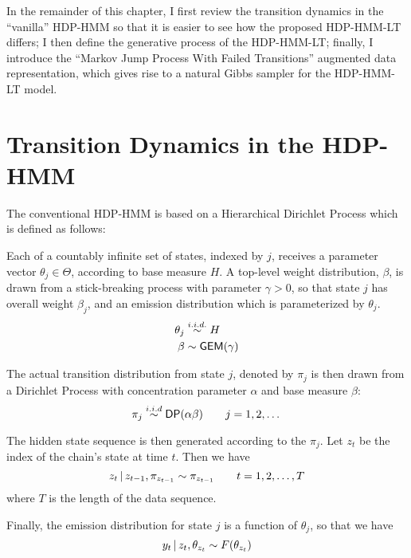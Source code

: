 In the remainder of this chapter, 
I first review the transition dynamics in the ``vanilla'' HDP-HMM so
that it is easier to see how the proposed HDP-HMM-LT differs; I then
define the generative process of the HDP-HMM-LT; finally, I introduce
the ``Markov Jump Process With Failed Transitions'' augmented data
representation, which gives rise to a natural Gibbs sampler for the
HDP-HMM-LT model.

\section{Transition Dynamics in the HDP-HMM}
\label{sec:transition-dynamics}

The conventional HDP-HMM \citep{teh2006hierarchical} is based on a 
Hierarchical Dirichlet Process which is defined as follows:

Each of a countably infinite set of states, indexed by $j$, receives a
parameter vector $\theta_j \in \Theta$, according to base measure $H$.  A top-level
weight distribution, $\beta$, is drawn from a stick-breaking
process with parameter $\gamma > 0$, so that state $j$ has overall
weight $\beta_j$, and an emission distribution which is parameterized by $\theta_j$.
\begin{align}
\theta_j &\stackrel{i.i.d.}{\sim} H \\
\beta &\sim \mathsf{GEM}(\gamma)
\end{align}

The actual transition distribution from state $j$, denoted by $\pi_j$
is then drawn from a Dirichlet Process with concentration parameter
$\alpha$ and base measure $\beta$:
\begin{equation}
  \label{eq:1}
  \pi_j \stackrel{i.i.d}{\sim} \mathsf{DP}(\alpha \beta) \qquad j = 1, 2, \dots
\end{equation}

The hidden state sequence is then generated according to the $\pi_j$.
Let $z_t$ be the index of the chain's state at time $t$.  Then we have
\begin{equation}
  \label{eq:4}
  z_t \, \vert \, z_{t-1}, \pi_{z_{t-1}} \sim \pi_{z_{t-1}} \qquad t = 1, 2, \dots, T
\end{equation}
where $T$ is the length of the data sequence.

Finally, the emission distribution for state $j$ is a function of
$\theta_j$, so that we have
\begin{equation}
  \label{eq:5}
  y_t \, \vert \, z_{t}, \theta_{z_t} \sim F(\theta_{z_t})
\end{equation}

